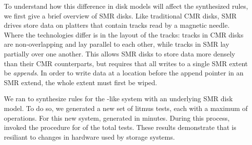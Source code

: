 To understand how this difference in disk models will affect the synthesized rules,
we first give a brief overview of SMR disks.
Like traditional CMR disks, SMR drives store data on platters that contain tracks
read by a magnetic needle.
Where the technologies differ is in the layout of the tracks:
tracks in CMR disks are non-overlapping and lay parallel to each other,
while tracks in SMR lay partially over one another.
This allows SMR disks to store data more densely than their CMR counterparts,
but requires that all writes to a single SMR extent be \textit{appends}.
In order to write data at a location before the append pointer in an SMR extend,
the whole extent must first be wiped.


We ran \depsynth to synthesize rules for the \shardstore-like system with an underlying SMR disk model.
To do so, we generated a new set of \shardstoreinputtests litmus tests, each with a maximum
of \shardstoremaxops operations.
For this new system, \depsynth generated \shardstoresmrnumrules
in \shardstoresmrsynthesistime minutes.
During this process, \depsynth invoked the  procedure
for \shardstoresmrtestsused of the total \shardstoreinputtests tests.
These results demonstrate that \depsynth is resiliant to changes in hardware used by storage systems.

